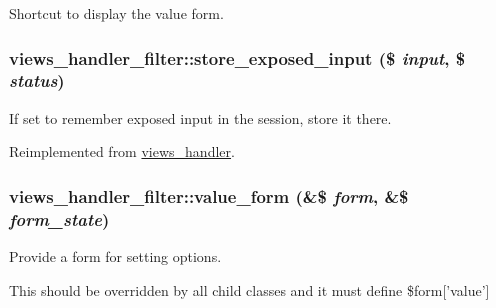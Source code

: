 Shortcut to display the value form. \hypertarget{classviews__handler__filter_7ad1d1cd56293ca452be9e7d5cfd8b94}{
\subsubsection[{store\_\-exposed\_\-input}]{\setlength{\rightskip}{0pt plus 5cm}views\_\-handler\_\-filter::store\_\-exposed\_\-input (\$ {\em input}, \/  \$ {\em status})}}
\label{classviews__handler__filter_7ad1d1cd56293ca452be9e7d5cfd8b94}


If set to remember exposed input in the session, store it there. 

Reimplemented from \hyperlink{classviews__handler_7f2453d86d3cb3850826e8c921012f16}{views\_\-handler}.\hypertarget{classviews__handler__filter_9168b39edae84b20e01a3fd0d810ba66}{
\subsubsection[{value\_\-form}]{\setlength{\rightskip}{0pt plus 5cm}views\_\-handler\_\-filter::value\_\-form (\&\$ {\em form}, \/  \&\$ {\em form\_\-state})}}
\label{classviews__handler__filter_9168b39edae84b20e01a3fd0d810ba66}


Provide a form for setting options.

This should be overridden by all child classes and it must define \$form\mbox{[}'value'\mbox{]} 

